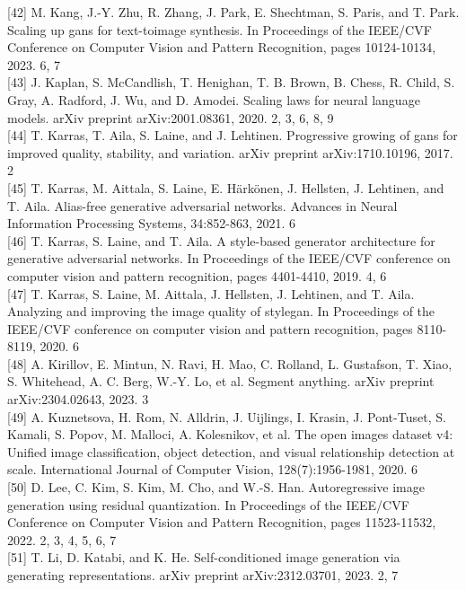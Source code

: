 \documentclass{article}
\begin{document}
[42] M. Kang, J.-Y. Zhu, R. Zhang, J. Park, E. Shechtman, S. Paris, and T. Park. Scaling up gans for text-toimage synthesis. In Proceedings of the IEEE/CVF Conference on Computer Vision and Pattern Recognition, pages 10124-10134, 2023. 6, 7\\[0pt]
[43] J. Kaplan, S. McCandlish, T. Henighan, T. B. Brown, B. Chess, R. Child, S. Gray, A. Radford, J. Wu, and D. Amodei. Scaling laws for neural language models. arXiv preprint arXiv:2001.08361, 2020. 2, 3, 6, 8, 9\\[0pt]
[44] T. Karras, T. Aila, S. Laine, and J. Lehtinen. Progressive growing of gans for improved quality, stability, and variation. arXiv preprint arXiv:1710.10196, 2017. 2\\[0pt]
[45] T. Karras, M. Aittala, S. Laine, E. Härkönen, J. Hellsten, J. Lehtinen, and T. Aila. Alias-free generative adversarial networks. Advances in Neural Information Processing Systems, 34:852-863, 2021. 6\\[0pt]
[46] T. Karras, S. Laine, and T. Aila. A style-based generator architecture for generative adversarial networks. In Proceedings of the IEEE/CVF conference on computer vision and pattern recognition, pages 4401-4410, 2019. 4, 6\\[0pt]
[47] T. Karras, S. Laine, M. Aittala, J. Hellsten, J. Lehtinen, and T. Aila. Analyzing and improving the image quality of stylegan. In Proceedings of the IEEE/CVF conference on computer vision and pattern recognition, pages 8110-8119, 2020. 6\\[0pt]
[48] A. Kirillov, E. Mintun, N. Ravi, H. Mao, C. Rolland, L. Gustafson, T. Xiao, S. Whitehead, A. C. Berg, W.-Y. Lo, et al. Segment anything. arXiv preprint arXiv:2304.02643, 2023. 3\\[0pt]
[49] A. Kuznetsova, H. Rom, N. Alldrin, J. Uijlings, I. Krasin, J. Pont-Tuset, S. Kamali, S. Popov, M. Malloci, A. Kolesnikov, et al. The open images dataset v4: Unified image classification, object detection, and visual relationship detection at scale. International Journal of Computer Vision, 128(7):1956-1981, 2020. 6\\[0pt]
[50] D. Lee, C. Kim, S. Kim, M. Cho, and W.-S. Han. Autoregressive image generation using residual quantization. In Proceedings of the IEEE/CVF Conference on Computer Vision and Pattern Recognition, pages 11523-11532, 2022. 2, 3, 4, 5, 6, 7\\[0pt]
[51] T. Li, D. Katabi, and K. He. Self-conditioned image generation via generating representations. arXiv preprint arXiv:2312.03701, 2023. 2, 7\\[0pt]
\end{document}
